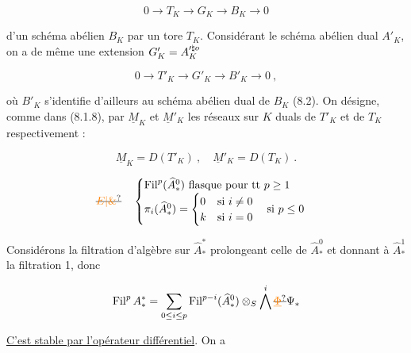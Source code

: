 \[
 0\longrightarrow T_K\longrightarrow G_K\longrightarrow B_K\longrightarrow0 \tag*{(14.1.1)}
\]

d'un schéma abélien $B_K$ par un tore $T_K$. Considérant le schéma abélien dual $A'_K$, on a de même une extension $G'_K=A_K^{\prime\natural o}$

\[
 0\longrightarrow T'_K\longrightarrow G'_K\longrightarrow B'_K\longrightarrow0\ , \tag*{(14.1.2)}
\]

où $B'_K$ s'identifie d'ailleurs au schéma abélien dual de $B_K$ (8.2). On désigne, comme dans (8.1.8), par $\underline M_K$ et $\underline M'_K$ les réseaux sur $K$ duals de $T'_K$ et de $T_K$ respectivement :

\[
 \underline M_K=D(T'_K)\ ,\quad\underline M'_K=D(T_K)\ . \tag*{(14.1.3)}
\]





\[
\deleted{\unsure{E|\&}}\quad
\begin{cases}
 \operatorname{Fil}^p(\widehat A_*^0)\ \text{flasque pour tt }p\geq1\\
 \pi_i(\widehat A_*^0)=\begin{cases}0&\text{si }i\ne0\\ k&\text{si }i=0\end{cases}
 \quad\text{si }p\leq0
\end{cases}
\]

Considérons la filtration d'algèbre  sur $\widehat A_*^*$ prolongeant celle de $\widehat A_*^0$ et donnant  à $\widehat A_*^1$ la filtration 1, donc

\[
 \operatorname{Fil}^p A_*^{*}=\sum_{0\leq i\leq p}\operatorname{Fil}^{p-i}(\widehat A_*^0)\otimes_S\bigwedge^i\deleted{\unsure{\underline\Phi}} \Psi_*
\]

\uline{C'est stable par l'opérateur différentiel}. On a 

